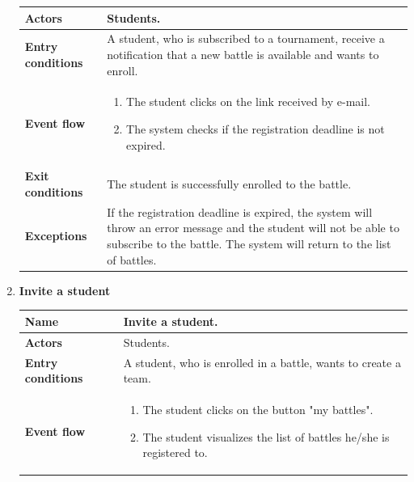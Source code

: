 \begin{enumerate}[label=\textbf{UC.\arabic*}]
\begin{table}[H]
\begin{tabular}{|m{3.2cm}|m{9.8cm}|}
                    \hline
                    \textbf{Actors} & Students. \\
                    \hline
                    \textbf{Entry conditions}  & A student, who is subscribed to a tournament, receive a notification that a new battle is available and wants to enroll.\\
                    \hline
                    \textbf{Event flow}  & 
                    \begin{enumerate}[label=\arabic*.]
                        \item The student clicks on the link received by e-mail.
                        \item The system checks if the registration deadline is not expired.
                    \end{enumerate}\\ 
                    \hline
                    \textbf{Exit conditions}  & The student is successfully enrolled to the battle. \\
                    \hline
                    \textbf{Exceptions}  & If the registration deadline is expired, the system will throw an error message and the student will not be able to subscribe to the battle. The system will return to the list of battles.  \\
                    \hline 
                \end{tabular}
        \end{table}
        \item {} \textbf{Invite a student}
        \begin{table}[H]
    	    \centering
                \renewcommand{\arraystretch}{1.5}
                \begin{tabular}{|m{3.2cm}|m{9.8cm}|}
                    \hline
                    \textbf{Name} & Invite a student. \\
                    \hline
                    \textbf{Actors} & Students. \\
                    \hline
                    \textbf{Entry conditions}  & A student, who is enrolled in a battle, wants to create a team. \\
                    \hline
                    \textbf{Event flow}  &  
                    \begin{enumerate}[label=\arabic*.]
                        \item The student clicks on the button "my battles".
                        \item The student visualizes the list of battles he/she is registered to.

\end{enumerate}
\end{tabular}
\end{table}
\end{enumerate}
